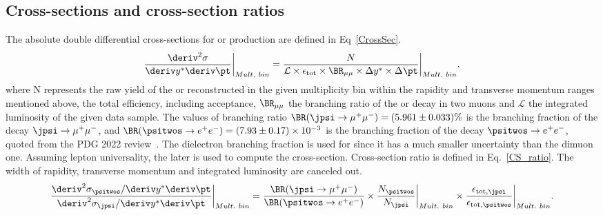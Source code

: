 \subsection{Cross-sections and cross-section ratios}
 The absolute double differential cross-sections for \jpsi or \psitwos production are defined in Eq~\ref{CrossSec}.
\begin{equation}
    \frac{\deriv^2\sigma}{\deriv y^*\deriv \pt}\bigg|_{Mult. \ bin}
    = \frac{N}
           {\mathcal{L}\times\effTot\times \BR_{\mu\mu}\times\Delta y^* \times \Delta \pt}\bigg|_{Mult. \ bin}.
  \label{CrossSec}
\end{equation}
where N represents the raw yield of the \jpsi or \psitwos reconstructed in the given multiplicity bin within the rapidity and transverse momentum ranges mentioned above, \effTot the total efficiency, including acceptance, $\BR_{\mu\mu}$ the branching ratio of the \jpsi or \psitwos decay in two muons and $\mathcal{L}$ the integrated luminosity of the given data sample. The values of branching ratio $\BR(\jpsi\rightarrow\mu^+\mu^-)=(5.961\pm0.033)\%$ is the branching fraction of the decay $\jpsi\rightarrow \mu^+ \mu^-$, and $\BR(\psitwos\rightarrow e^+e^-)=(7.93\pm0.17)\times10^{-3}$ is the branching fraction of the decay $\psitwos\rightarrow e^+ e^-$, quoted from the PDG 2022 review~\cite{Workman:2022ynf}. The dielectron branching fraction is used for \psitwos since it has a much smaller uncertainty than the dimuon one. Assuming lepton universality, the later is used to compute the cross-section.
Cross-section ratio is defined in Eq.~\ref{CS_ratio}. The width of rapidity, transverse momentum and integrated luminosity are canceled out.
\begin{equation}
    \frac{\deriv^2\sigma_{\psitwos}/\deriv y^*\deriv \pt}{\deriv^2\sigma_{\jpsi}/\deriv y^*\deriv \pt}\bigg|_{Mult. \ bin}
    =\frac{\BR(\jpsi \rightarrow \mu^+ \mu^-)}{\BR(\psitwos\rightarrow e^+e^-)}\times \frac{N_{\psitwos}}{N_{\jpsi}}\bigg|_{Mult. \ bin}\times \frac{\ensuremath{\epsilon_{\mathrm{tot,\jpsi}}}}{\ensuremath{\epsilon_{\mathrm{tot,\psitwos}}}}\bigg|_{Mult. \ bin}.
\label{CS_ratio}
\end{equation}



